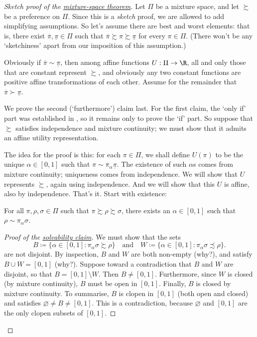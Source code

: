 \begin{proof}[Sketch proof of the {\hyperref[theorem:mix]{mixture-space theorem}}]
	Let $\Pi$ be a mixture space, and let $\succsim$ be a preference on $\Pi$. Since this is a \emph{sketch} proof, we are allowed to add simplifying assumptions. So let's assume there are best and worst elements: that is, there exist $\overline{\pi},\underline{\pi} \in \Pi$ such that $\overline{\pi} \succsim \pi \succsim \underline{\pi}$ for every $\pi \in \Pi$. (There won't be any `sketchiness' apart from our imposition of this assumption.)

	Obviously if $\overline{\pi} \sim \underline{\pi}$, then among affine functions $U : \Pi \to \R$, all and only those that are constant represent $\succsim$, and obviously any two constant functions are positive affine transformations of each other. Assume for the remainder that $\overline{\pi} \succ \underline{\pi}$.

	We prove the second (`furthermore') claim last. For the first claim, the `only if' part was established in , so it remains only to prove the `if' part. So suppose that $\succsim$ satisfies independence and mixture continuity; we must show that it admits an affine utility representation.

	The idea for the proof is this: for each $\pi \in \Pi$, we shall define $U(\pi)$ to be the unique $\alpha \in [0,1]$ such that $\pi \sim \overline{\pi}_\alpha \underline{\pi}$. The existence of such $\alpha$s comes from mixture continuity; uniqueness comes from independence. We will show that $U$ represents $\succsim$, again using independence. And we will show that this $U$ is affine, also by independence. That's it. Start with existence:

	\begin{namedthm}
		\label{claim:mix:solv}
		For all $\pi,\rho,\sigma \in \Pi$ such that $\pi \succsim \rho \succsim \sigma$, there exists an $\alpha \in [0,1]$ such that $\rho \sim \pi_\alpha \sigma$.
	\end{namedthm}

	\begin{proof}[Proof of the {\hyperref[claim:mix:solv]{solvability claim}}]
		\renewcommand{\qedsymbol}{$\square$}
		We must show that the sets
		\begin{equation*}
			B \coloneqq \{ \alpha \in [0,1] : \pi_\alpha \sigma \succsim \rho \}
			\quad \text{and} \quad
			W \coloneqq \{ \alpha \in [0,1] : \pi_\alpha \sigma \precsim \rho \} .
		\end{equation*}
		are not disjoint. By inspection, $B$ and $W$ are both non-empty (why?), and satisfy $B \cup W = [0,1]$ (why?). Suppose toward a contradiction that $B$ and $W$ are disjoint, so that $B = [0,1] \setminus W$. Then $B \neq [0,1]$. Furthermore, since $W$ is closed (by mixture continuity), $B$ must be open in $[0,1]$. Finally, $B$ is closed by mixture continuity. To summarise, $B$ is clopen in $[0,1]$ (both open and closed) and satisfies $\varnothing \neq B \neq [0,1]$. This is a contradiction, because $\varnothing$ and $[0,1]$ are the only clopen subsets of $[0,1]$.
	\end{proof}%
	\renewcommand{\qedsymbol}{$\blacksquare$}


\end{proof}
